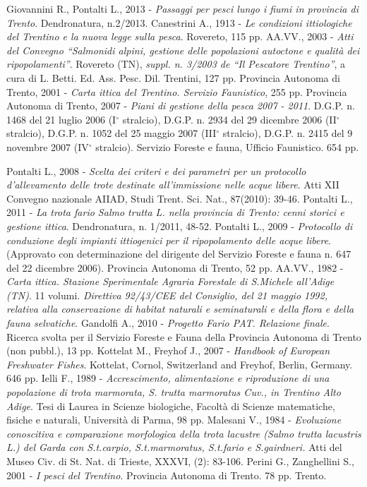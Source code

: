 \documentclass[10pt,twoside,openany,x11names,svgnames,italian,a5paper,dvipsnames,table]{memoir}
\begin{document}
\begin{thebibliography}{9}
 Giovannini R., Pontalti L., 2013 - \emph{Passaggi per pesci lungo i fiumi in provincia di Trento}. Dendronatura, n.2/2013.
 Canestrini A., 1913 - \emph{Le condizioni ittiologiche del Trentino e la nuova legge sulla pesca}. Rovereto, 115 pp.
 AA.VV., 2003 - \emph{Atti del Convegno “Salmonidi alpini, gestione delle popolazioni autoctone e qualità dei ripopolamenti”}. Rovereto (TN), \emph{suppl. n. 3/2003 de “Il Pescatore Trentino”}, a cura di L. Betti. Ed. Ass. Pesc. Dil. Trentini, 127 pp.
 Provincia Autonoma di Trento, 2001 - \emph{Carta ittica del Trentino. Servizio Faunistico}, 255 pp. 
 Provincia Autonoma di Trento, 2007 - \emph{Piani di gestione della pesca 2007 - 2011}. D.G.P. n. 1468 del 21 luglio 2006 (I$^\circ$ stralcio), D.G.P. n. 2934 del 29 dicembre 2006 (II$^\circ$ stralcio), D.G.P. n. 1052 del 25 maggio 2007 (III$^\circ$ stralcio), D.G.P. n. 2415 del 9 novembre 2007 (IV$^\circ$ stralcio). Servizio Foreste e fauna, Ufficio Faunistico. 654 pp.

 Pontalti L., 2008 - \emph{Scelta dei criteri e dei parametri per un protocollo d’allevamento delle trote destinate all’immissione nelle acque libere}. Atti XII Convegno nazionale AIIAD, Studi Trent. Sci. Nat., 87(2010): 39-46.
 Pontalti L., 2011 - \emph{La trota fario Salmo trutta L. nella provincia di Trento: cenni storici e gestione ittica}. Dendronatura, n. 1/2011, 48-52.
 Pontalti L., 2009 - \emph{Protocollo di conduzione degli impianti ittiogenici per il ripopolamento delle acque libere}. (Approvato con determinazione del dirigente del Servizio Foreste e fauna  n. 647 del 22 dicembre 2006). Provincia Autonoma di Trento, 52 pp.
 AA.VV., 1982 - \emph{Carta ittica. Stazione Sperimentale Agraria Forestale di S.Michele all’Adige (TN)}. 11 volumi.
 \emph{Direttiva 92/43/CEE del Consiglio, del 21 maggio 1992, relativa alla conservazione di habitat naturali e seminaturali e della flora e della fauna selvatiche}.
 Gandolfi A., 2010 - \emph{Progetto Fario PAT. Relazione finale}. Ricerca svolta per il Servizio Foreste e Fauna della Provincia Autonoma di Trento (non pubbl.), 13 pp. 
 Kottelat M., Freyhof J., 2007 - \emph{Handbook of European Freshwater Fishes}. Kottelat, Cornol, Switzerland and Freyhof, Berlin, Germany. 646 pp. 
 Ielli F., 1989 - \emph{Accrescimento, alimentazione e riproduzione di una popolazione di trota marmorata, S. trutta marmoratus Cuv., in Trentino Alto Adige}. Tesi di Laurea in Scienze biologiche, Facoltà di Scienze matematiche, fisiche e naturali, Università di Parma, 98 pp.
 Malesani V., 1984 - \emph{Evoluzione conoscitiva e comparazione morfologica della trota lacustre (Salmo trutta lacustris L.) del Garda con S.t.carpio, S.t.marmoratus, S.t.fario e S.gairdneri.} Atti del Museo Civ. di St. Nat. di Trieste, XXXVI, (2): 83-106.
 Perini G., Zanghellini S., 2001 -  \emph{I pesci del Trentino}. Provincia Autonoma di Trento. 78 pp. Trento.



\end{thebibliography}
\end{document}
